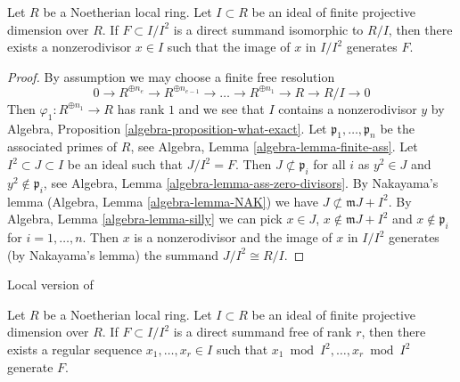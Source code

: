 \begin{lemma}
\label{lemma-free-summand-in-ideal-finite-proj-dim}
\begin{reference}
\cite{Vasconcelos}
\end{reference}
Let $R$ be a Noetherian local ring. Let $I \subset R$ be an ideal
of finite projective dimension over $R$. If $F \subset I/I^2$ is a
direct summand isomorphic to $R/I$, then there exists a nonzerodivisor
$x \in I$ such that the image of $x$ in $I/I^2$ generates $F$.
\end{lemma}

\begin{proof}
By assumption we may choose a finite free resolution
$$
0 \to R^{\oplus n_e} \to R^{\oplus n_{e-1}} \to \ldots \to
R^{\oplus n_1} \to R \to R/I \to 0
$$
Then $\varphi_1 : R^{\oplus n_1} \to R$ has rank $1$ and
we see that $I$ contains a nonzerodivisor $y$ by
Algebra, Proposition \ref{algebra-proposition-what-exact}.
Let $\mathfrak p_1, \ldots, \mathfrak p_n$ be the associated
primes of $R$, see Algebra, Lemma \ref{algebra-lemma-finite-ass}.
Let $I^2 \subset J \subset I$ be an ideal such that $J/I^2 = F$.
Then $J \not \subset \mathfrak p_i$ for all $i$
as $y^2 \in J$ and $y^2 \not \in \mathfrak p_i$, see
Algebra, Lemma \ref{algebra-lemma-ass-zero-divisors}.
By Nakayama's lemma (Algebra, Lemma \ref{algebra-lemma-NAK})
we have $J \not \subset \mathfrak m J + I^2$.
By Algebra, Lemma \ref{algebra-lemma-silly}
we can pick $x \in J$, $x \not \in \mathfrak m J + I^2$ and
$x \not \in \mathfrak p_i$ for $i = 1, \ldots, n$.
Then $x$ is a nonzerodivisor and the image
of $x$ in $I/I^2$ generates (by Nakayama's lemma)
the summand $J/I^2 \cong R/I$.
\end{proof}

\begin{lemma}
\label{lemma-vasconcelos}
\begin{reference}
Local version of \cite[Theorem 1.1]{Vasconcelos}
\end{reference}
Let $R$ be a Noetherian local ring. Let $I \subset R$ be an ideal
of finite projective dimension over $R$. If $F \subset I/I^2$
is a direct summand free of rank $r$, then there exists a regular sequence
$x_1, \ldots, x_r \in I$ such that $x_1 \bmod I^2, \ldots, x_r \bmod I^2$
generate $F$.
\end{lemma}

